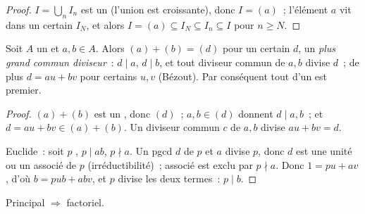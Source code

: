 \begin{proof}
$I = \bigcup_n I_n$ est un  (l'union est croissante), donc
$I = (a)$~; l'élément $a$ vit dans un certain $I_N$, et alors $I
= (a) \subseteq I_N \subseteq I_n \subseteq I$ pour $n \geq N$.
\end{proof}

\begin{lemma}\label{lem:b3:rings:bezout}
Soit $A$ un  et $a, b \in A$. Alors $(a) + (b) = (d)$ pour un
certain $d$, un \emph{plus grand commun
diviseur}~: $d \mid a$, $d
\mid b$, et tout diviseur commun de $a, b$ divise $d$~; de plus
$d = au + bv$ pour certains $u, v$ (Bézout). Par conséquent tout
 d'un  est premier.
\end{lemma}

\begin{proof}
$(a) + (b)$ est un , donc $(d)$~; $a, b \in (d)$ donnent $d
\mid a, b$~; et $d = au + bv \in (a) + (b)$. Un diviseur commun
$c$ de $a, b$ divise $au + bv = d$.

Euclide~: soit $p$ , $p \mid ab$, $p \nmid a$. Un
pgcd $d$ de $p$ et $a$ divise $p$, donc $d$ est une unité ou un
associé de $p$ (irréductibilité)~; associé est exclu par $p
\nmid a$. Donc $1 = pu + av$, d'où $b = pub + abv$, et $p$
divise les deux termes~: $p \mid b$.
\end{proof}

\begin{theorem}\label{thm:b3:rings:pidufd}
Principal $\Rightarrow$ factoriel.
\end{theorem}

